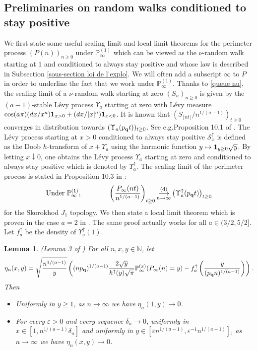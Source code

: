 \documentclass[11pt]{article}
\newtheorem{lemma}[theorem]{Lemma}
\numberwithin{equation}{section}
\def\vp{\varepsilon}
\def \N{\mathbb{N}}
\def\P{\mathbb{P}}
\begin{document}
\subsection{Preliminaries on random walks conditioned to stay positive}\label{sous-section preliminaires marche conditionnee}
We first state some useful scaling limit and local limit theorems for the perimeter process $(P(n))_{n\ge 0}$ under $\P^{(1)}_\infty$ which can be viewed as the $\nu$-random walk starting at $1$ and conditioned to {always stay} positive and whose law is described in Subsection \ref{sous-section loi de l'explo}. We will often add a subscript $\infty$ to $P$ in order to underline the fact that we work under $\P^{(1)}_\infty$. Thanks to \eqref{queue nu}, the scaling limit of a $\nu$-random walk starting at zero $(S_n)_{n\ge 0}$ is given by the $(a-1)$-stable Lévy process $\Upsilon_a$  starting at zero with Lévy measure $\cos(a \pi) (dx/x^a) {\bf 1}_{x>0} + (dx/\vert x \vert^a) {\bf 1}_{x<0}$. It is known that $(S_{\lfloor nt \rfloor}/n^{1/(a-1)})_{t\ge 0}$ converges in distribution towards $(\Upsilon_a(p_{\bf q} t))_{t\ge 0}$. See e.g.\@ Proposition 10.1 of \cite{StFlour}. The Lévy process starting at $x>0$ conditioned to {always stay} positive $\mathcal{S}^\uparrow_x$ is defined as the Doob $h$-transform of $x+\Upsilon_a$ using the harmonic function $y \mapsto {\bf 1}_{y\ge 0} \sqrt{y}$. By letting $x\downarrow 0$, one obtains the Lévy process $\Upsilon_a$ starting at zero and conditioned to {always stay} positive which is denoted by $\Upsilon^\uparrow_a$. The scaling limit of the perimeter process is stated in Proposition 10.3 in \cite{StFlour}:
\begin{equation}\label{cv perimetre}
	\text{Under } \P^{(1)}_\infty, 
	\qquad 
	\qquad
	\left( \frac{P_\infty(nt)}{n^{1/(a-1)}} \right)_{t\ge 0}
	\mathop{\longrightarrow}\limits_{n \to \infty}^{(\mathrm{d})}
	\left(
	\Upsilon^\uparrow_a(p_{\bf q} t)
	\right)_{t\ge 0}
\end{equation}
for the Skorokhod $J_1$ topology. We then state a local limit theorem which is proven in the case $a=2$ in \cite{BCM}. The same proof actually works for all $a \in (3/2,5/2]$. Let $f_a^\uparrow$ be the density of $\Upsilon_a^\uparrow(1)$.
\begin{lemma}\label{lemme limite locale}(Lemma 3 of \cite{BCM})
For all $n,x,y \in \N$, let
$$
\eta_n(x,y) = 
\sqrt{\frac{n^{1/(a-1)}}{y}} \left(
(np_{\bf q})^{1/(a-1)} \frac{2\sqrt{y}}{h^\uparrow(y) \sqrt{\pi}} \P^{(x)}_\infty(P_\infty(n)=y)
- f^\uparrow_a\left(\frac{y}{(p_{\bf q} n)^{1/(a-1)}} \right) 
\right).
$$
Then
\begin{itemize}
\item Uniformly in $y\ge 1$, as $n \to \infty$ we have $\eta_n(1,y)\to0$.
\item For every $\vp >0$ and every sequence $\delta_n \to 0$, uniformly in $x \in [1,n^{1/(a-1)}\delta_n]$ and uniformly in $y \in[\vp n^{1/(a-1)} , \vp^{-1} n^{1/(a-1)} ]$, as $n\to \infty$ we have $\eta_n(x,y) \to 0$.
\end{itemize}
\end{lemma}
\end{document}
